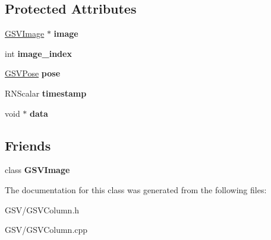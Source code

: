 \subsection*{Protected Attributes}
\begin{DoxyCompactItemize}
\item 
\hyperlink{class_g_s_v_image}{G\+S\+V\+Image} $\ast$ {\bfseries image}\hypertarget{class_g_s_v_column_a6820f242469f2a1af4fe88a17381fc63}{}\label{class_g_s_v_column_a6820f242469f2a1af4fe88a17381fc63}

\item 
int {\bfseries image\+\_\+index}\hypertarget{class_g_s_v_column_a1ba9003cc5c404f176cb9b9e046dfdbd}{}\label{class_g_s_v_column_a1ba9003cc5c404f176cb9b9e046dfdbd}

\item 
\hyperlink{class_g_s_v_pose}{G\+S\+V\+Pose} {\bfseries pose}\hypertarget{class_g_s_v_column_accec22bdc63e96c741f830e47a5a4f89}{}\label{class_g_s_v_column_accec22bdc63e96c741f830e47a5a4f89}

\item 
R\+N\+Scalar {\bfseries timestamp}\hypertarget{class_g_s_v_column_ab445a131f7dcca4d431e0915a089907e}{}\label{class_g_s_v_column_ab445a131f7dcca4d431e0915a089907e}

\item 
void $\ast$ {\bfseries data}\hypertarget{class_g_s_v_column_aa5427140e131e0efc128ce86f8841869}{}\label{class_g_s_v_column_aa5427140e131e0efc128ce86f8841869}

\end{DoxyCompactItemize}
\subsection*{Friends}
\begin{DoxyCompactItemize}
\item 
class {\bfseries G\+S\+V\+Image}\hypertarget{class_g_s_v_column_a09431d590b2336bd3cb4e449153ad773}{}\label{class_g_s_v_column_a09431d590b2336bd3cb4e449153ad773}

\end{DoxyCompactItemize}


The documentation for this class was generated from the following files\+:\begin{DoxyCompactItemize}
\item 
G\+S\+V/G\+S\+V\+Column.\+h\item 
G\+S\+V/G\+S\+V\+Column.\+cpp\end{DoxyCompactItemize}

